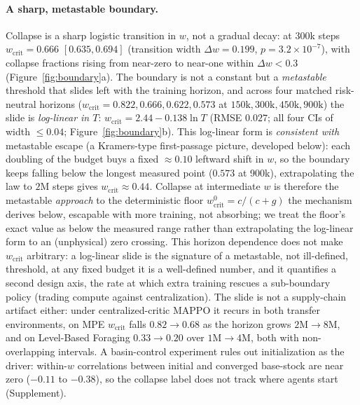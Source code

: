 \documentclass[letterpaper]{article} %
\theoremstyle{plain}
\newcommand{\wcrit}{w_{\mathrm{crit}}}
\begin{document}
\paragraph{A sharp, metastable boundary.}
Collapse is a sharp logistic transition in $w$, not a gradual decay: at 300k steps
$\wcrit=0.666$ $[0.635,0.694]$ (transition width $\Delta w=0.199$, $p=3.2\times10^{-7}$), with
collapse fractions rising from near-zero to near-one within $\Delta w<0.3$
(Figure~\ref{fig:boundary}a). The boundary is not a constant but a \emph{metastable} threshold that
slides left with the training horizon, and across four matched risk-neutral horizons
($\wcrit=0.822,0.666,0.622,0.573$ at $150\mathrm{k},300\mathrm{k},450\mathrm{k},900\mathrm{k}$) the
slide is \emph{log-linear in $T$}: $\wcrit=2.44-0.138\ln T$ (RMSE $0.027$; all four CIs of width
${\le}0.04$; Figure~\ref{fig:boundary}b). This log-linear form is \emph{consistent with} metastable
escape (a Kramers-type first-passage picture, developed below): each doubling of the budget
buys a fixed $\approx0.10$ leftward shift in $w$, so the boundary keeps falling below the longest
measured point
($0.573$ at 900k), extrapolating the law to $2\mathrm{M}$ steps gives $\wcrit\approx0.44$. Collapse
at intermediate $w$ is therefore the metastable \emph{approach} to the deterministic floor
$\wcrit^0=c/(c+g)$ the mechanism derives below, escapable with more training, not
absorbing; we treat the floor's exact value as below the measured range rather than extrapolating
the log-linear form to an (unphysical) zero crossing. This horizon dependence does not make $\wcrit$
arbitrary: a log-linear slide is the signature of a metastable, not ill-defined, threshold, at any
fixed budget it is a well-defined number, and it quantifies a second design axis, the rate at which
extra training rescues a sub-boundary policy (trading compute against centralization). The slide is not a supply-chain artifact either: under centralized-critic MAPPO it recurs
in both transfer environments, on MPE $\wcrit$ falls $0.82\to0.68$ as the horizon grows
$2\mathrm{M}\to8\mathrm{M}$, and on Level-Based Foraging
$0.33\to0.20$ over $1\mathrm{M}\to4\mathrm{M}$, both with non-overlapping intervals. A
basin-control experiment rules out initialization as the driver: within-$w$ correlations between
initial and converged base-stock are near zero ($-0.11$ to $-0.38$), so the collapse label does not
track where agents start (Supplement).
\end{document}
